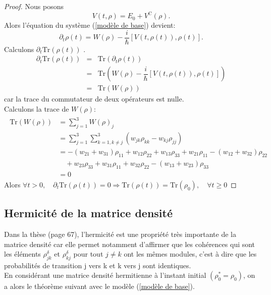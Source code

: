 \documentclass[12pt,a4paper,openany,oneside]{book}
\begin{document}
{{{{{{\begin{proof}
Nous posons $$ V(t,\rho)= E_{0} +  V^{\textrm{C}}(\rho). $$
Alors l'équation du système (\ref{modèle de base}) devient:
\begin{equation}\label{equation du modele de base}
\partial_{t}\rho(t) = W(\rho)-\dfrac{i}{\hbar}\left[V(t,\rho(t)),\rho(t)\right].
\end{equation}
Calculons $ \partial_{t}\textrm{Tr}(\rho(t))$ .
\begin{eqnarray*}
\partial_{t}\textrm{Tr}(\rho(t)) & = & \textrm{Tr}(\partial_{t}\rho(t))\\
                     & =  & \textrm{Tr}\left(W(\rho)-\dfrac{i}{\hbar}\left[V(t,\rho(t)),\rho(t)\right]\right)\\
                     & =  & \textrm{Tr}\left(W(\rho)\right)
\end{eqnarray*}
car la trace du commutateur de deux opérateurs est nulle.\\
Calculons la trace de $ W(\rho) $:
%
\begin{eqnarray*}
\begin{split}
\textrm{Tr}\left(W(\rho)\right) & =  \sum_{j=1}^{3} W(\rho)_{j} \\ 
& = \displaystyle\sum_{j=1}^{3}\sum_{k=1,k\neq j}^{3} (w_{jk}\rho_{kk}-w_{kj}\rho_{jj})\\
& =  -(w_{21} + w_{31})\rho_{11} + w_{12}\rho_{22} + w_{13}\rho_{33} + w_{21}\rho_{11}-(w_{12} + w_{32})\rho_{22}  \\
&\quad + w_{23}\rho_{33}+ w_{31}\rho_{11} + w_{32}\rho_{22}-(w_{13} + w_{23})\rho_{33}\\
& = 0
\end{split}
\end{eqnarray*}
Alors $ \forall t>0 , \quad \partial_{t}\textrm{Tr}(\rho(t)) = 0 \Rightarrow \textrm{Tr}(\rho(t))= \textrm{Tr}(\rho_{0}),\quad \forall t\geq 0 $
\end{proof}

\subsection{Hermicité de la matrice densité}  
Dans la thèse \cite{mareference1} (page 67), l’hermicité est une propriété très importante de la matrice densité car elle permet notamment d’aﬃrmer que les cohérences qui sont les éléments $\rho_{jk}^{\delta}$ et $\rho_{kj}^{\delta}$ pour tout $j \neq k$ ont les mêmes modules, c'est à dire que les probabilités de transition j vers k et k vers j sont identiques.\\
En considérant une matrice densité hermitienne à l’instant initial $(\rho_{0}^{*}=\rho_{0})$, on a alors
le théorème suivant avec le modèle (\ref{modèle de base}).

}}}}}}
\end{document}
